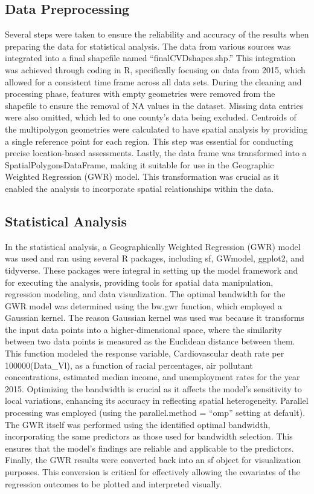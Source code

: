 \documentclass[
]{article}
\begin{document}
\subsection{Data Preprocessing}\label{data-preprocessing}

Several steps were taken to ensure the reliability and accuracy of the
results when preparing the data for statistical analysis. The data from
various sources was integrated into a final shapefile named
``finalCVDshapes.shp.'' This integration was achieved through coding in
R, specifically focusing on data from 2015, which allowed for a
consistent time frame across all data sets. During the cleaning and
processing phase, features with empty geometries were removed from the
shapefile to ensure the removal of NA values in the dataset. Missing
data entries were also omitted, which led to one county's data being
excluded. Centroids of the multipolygon geometries were calculated to
have spatial analysis by providing a single reference point for each
region. This step was essential for conducting precise location-based
assessments. Lastly, the data frame was transformed into a
SpatialPolygonsDataFrame, making it suitable for use in the Geographic
Weighted Regression (GWR) model. This transformation was crucial as it
enabled the analysis to incorporate spatial relationships within the
data.

\subsection{Statistical Analysis}\label{statistical-analysis}

In the statistical analysis, a Geographically Weighted Regression (GWR)
model was used and ran using several R packages, including sf, GWmodel,
ggplot2, and tidyverse. These packages were integral in setting up the
model framework and for executing the analysis, providing tools for
spatial data manipulation, regression modeling, and data visualization.
The optimal bandwidth for the GWR model was determined using the bw.gwr
function, which employed a Gaussian kernel. The reason Gaussian kernel
was used was because it transforms the input data points into a
higher-dimensional space, where the similarity between two data points
is measured as the Euclidean distance between them. This function
modeled the response variable, Cardiovascular death rate per
100000(Data\_Vl), as a function of racial percentages, air pollutant
concentrations, estimated median income, and unemployment rates for the
year 2015. Optimizing the bandwidth is crucial as it affects the model's
sensitivity to local variations, enhancing its accuracy in reflecting
spatial heterogeneity. Parallel processing was employed (using the
parallel.method = ``omp'' setting at default). The GWR itself was
performed using the identified optimal bandwidth, incorporating the same
predictors as those used for bandwidth selection. This ensures that the
model's findings are reliable and applicable to the predictors. Finally,
the GWR results were converted back into an sf object for visualization
purposes. This conversion is critical for effectively allowing the
covariates of the regression outcomes to be plotted and interpreted
visually.
\end{document}
